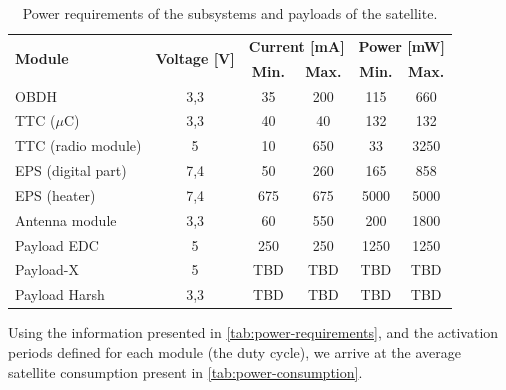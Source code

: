 \begin{table}[!h]
    \centering
    \begin{tabular}{lccccc}
        \toprule[1.5pt]
        \multirow{2}{*}{\textbf{Module}} & \multirow{2}{*}{\textbf{Voltage [V]}}    & \multicolumn{2}{c}{\textbf{Current [mA]}} & \multicolumn{2}{c}{\textbf{Power [mW]}} \\
                                         &                                          & \textbf{Min.} & \textbf{Max.}             & \textbf{Min.} & \textbf{Max.} \\
        \midrule
        OBDH                & 3,3   & 35    & 200   & 115   & 660 \\
        TTC ($\mu$C)        & 3,3   & 40    & 40    & 132   & 132 \\
        TTC (radio module)  & 5     & 10    & 650   & 33    & 3250 \\
        EPS (digital part)  & 7,4   & 50    & 260   & 165   & 858 \\
        EPS (heater)        & 7,4   & 675   & 675   & 5000  & 5000 \\
        Antenna module      & 3,3   & 60    & 550   & 200   & 1800 \\
        Payload EDC         & 5     & 250   & 250   & 1250  & 1250 \\
        Payload-X           & 5     & TBD   & TBD   & TBD   & TBD \\
        Payload Harsh       & 3,3   & TBD   & TBD   & TBD   & TBD \\
        \bottomrule[1.5pt]
    \end{tabular}
    \caption{Power requirements of the subsystems and payloads of the satellite.}
    \label{tab:power-requirements}
\end{table}

Using the information presented in \autoref{tab:power-requirements}, and the activation periods defined for each module (the duty cycle), we arrive at the average satellite consumption present in \autoref{tab:power-consumption}.

